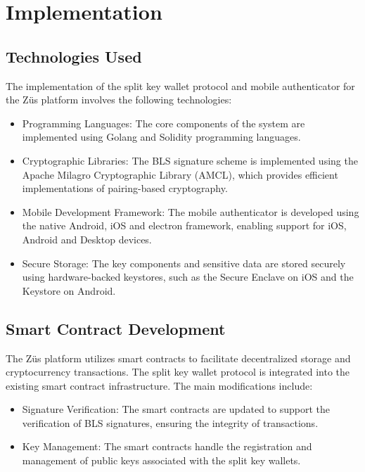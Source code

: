 \chapter{Implementation}
\label{Chapter4}


\section{Technologies Used}
The implementation of the split key wallet protocol and mobile authenticator for the Züs platform involves the following technologies:
\begin{itemize}
    \item Programming Languages: The core components of the system are implemented using Golang and Solidity programming languages.
    \item Cryptographic Libraries: The BLS signature scheme is implemented using the Apache Milagro Cryptographic Library (AMCL), which provides efficient implementations of pairing-based cryptography.
    \item Mobile Development Framework: The mobile authenticator is developed using the native Android, iOS and electron framework, enabling support for iOS, Android and Desktop devices.
    \item Secure Storage: The key components and sensitive data are stored securely using hardware-backed keystores, such as the Secure Enclave on iOS and the Keystore on Android.
\end{itemize}


\section{Smart Contract Development}
The Züs platform utilizes smart contracts to facilitate decentralized storage and cryptocurrency transactions. The split key wallet protocol is integrated into the existing smart contract infrastructure. The main modifications include:
\begin{itemize}
    \item Signature Verification: The smart contracts are updated to support the verification of BLS signatures, ensuring the integrity of transactions.
    \item Key Management: The smart contracts handle the registration and management of public keys associated with the split key wallets.
\end{itemize}


